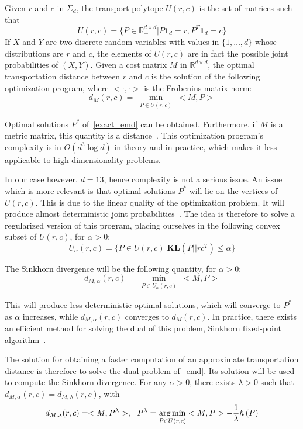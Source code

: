 Given $r$ and $c$ in $\Sigma_d$, the transport polytope $U(r,c)$ is the set of matrices such that 
\[
U(r,c)=\{ P\in \mathbb{R}^{d\times d}_+ | P\mathbf{1}_d = r, P^T \mathbf{1}_d = c \}\] 
If $X$ and $Y$ are two discrete random variables with values in $ \{1,\ldots , d\} $ whose distributions are $r$ and $c$, the elements of $U(r,c)$ are in fact the possible joint probabilities of $\left( X,Y\right)$. Given a cost matrix $M$ in $\mathbb{R}^{d\times d}$, the optimal transportation distance between $r$ and $c$ is the solution of the following optimization program, where $<\cdot, \cdot> $ is the Frobenius matrix norm:
\begin{equation}
d_M(r,c) = \min_{\substack{P\in U(r,c)}} <M,P>
\label{exact_emd}
\end{equation}

Optimal solutions $P^*$ of~\ref{exact_emd} can be obtained. Furthermore, if $M$ is a metric matrix, this quantity is a distance~\cite{Villani}. This optimization program's complexity is in $O\left( d^3\log d\right) $ in theory and in practice, which makes it less applicable to high-dimensionality problems. 

In our case however, $d=13$, hence complexity is not a serious issue. An issue which is more relevant is that optimal solutions $P^*$ will lie on the vertices of $U(r,c)$. This is due to the linear quality of the optimization problem. It will produce almost deterministic joint probabilities~\cite{sinkhorn}. The idea is therefore to solve a regularized version of this program, placing ourselves in the following convex subset of $U(r,c)$, for $\alpha >0$:
\[
U_\alpha\left( r, c\right) = \{ P \in U\left( r,c \right) | \mathbf{KL}\left(P || rc^T\right)\leqslant \alpha\}
\]

The Sinkhorn divergence will be the following quantity, for $\alpha >0$:
\begin{equation}
d_{M, \alpha}(r,c) = \min_{\substack{P\in U_\alpha (r,c)}} <M,P>
\label{emd}
\end{equation}

This will produce less deterministic optimal solutions, which will converge to $P^*$ as $\alpha$ increases, while $d_{M, \alpha}(r,c)$ converges to $d_{M}(r,c)$. In practice, there exists an efficient method for solving the dual of this problem, Sinkhorn fixed-point algorithm~\cite{sinkhorn_original}. 

The solution for obtaining a faster computation of an approximate transportation distance is therefore to solve the dual problem of~\ref{emd}. Its solution will be used to compute the Sinkhorn divergence. For any $\alpha >0$, there exists $\lambda >0$ such that $d_{M, \alpha}(r,c) = d_{M, \lambda}(r,c)$, with
\[
d_{M, \lambda}(r,c) = <M,P^\lambda>,~~ P^\lambda = \operatorname*{arg\,min}_{\substack{P\in U (r,c)}} <M,P> - \dfrac{1}{\lambda} h\left( P\right)
\]

